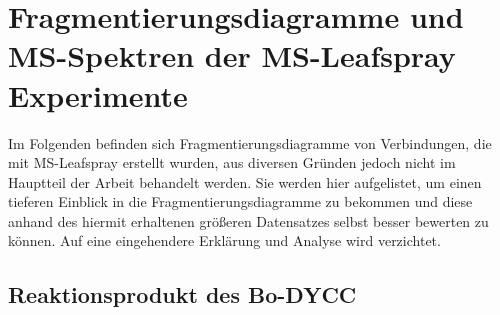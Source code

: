 \chapter{Fragmentierungsdiagramme und MS-Spektren der MS-Leafspray Experimente}

Im Folgenden befinden sich Fragmentierungsdiagramme von Verbindungen, die mit MS-Leafspray erstellt wurden, aus diversen Gründen jedoch nicht im Hauptteil der Arbeit behandelt werden. Sie werden hier aufgelistet, um einen tieferen Einblick in die Fragmentierungsdiagramme zu bekommen und diese anhand des hiermit erhaltenen größeren Datensatzes selbst besser bewerten zu können. Auf eine eingehendere Erklärung und Analyse wird verzichtet.

\section{Reaktionsprodukt des Bo-DYCC}

